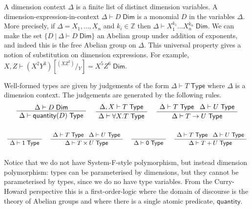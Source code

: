\documentclass[a4paper,UKenglish]{lipics}
\theoremstyle{plain}
\newcommand{\msf}[1]{\mathsf{#1}} %
\newcommand{\unitTy}{\msf{1}}
\newcommand{\emptyTy}{\msf{0}}
\newcommand{\qnt}{\msf{quantity}}
\newcommand{\Tj}[2]{#1 \vdash #2 \; \msf{ Type}}
\newcommand{\Dj}[2]{#1 \vdash #2 \; \msf{ Dim}}
\newcommand{\Dim}{D}
\newcommand{\Dvar}{X}
\begin{document}
\vspace{3mm} 
A dimension context $\Delta$ is a finite list of distinct
dimension variables.
A dimension-expression-in-context $\Dj\Delta \Dim$ is a monomial
$\Dim$ in the variables $\Delta$.
More precisely,
if $\Delta=\Dvar_1,\ldots, \Dvar_n$ and $k_i\in\mathbb Z$
then $\Dj \Delta{\Dvar_1^{k_1}\dots \Dvar_n^{k_n}}$.
We can make the set $\{\Dim~|~\Dj \Delta \Dim\}$ an Abelian group under addition of
exponents, and indeed this is the free Abelian group on $\Delta$.
This universal property gives a notion of substitution on dimension expressions.
For example,
$\Dj{X,Z}{(X^2Y^3)[^{(XZ^2)}\!/\!_Y]=X^5Z^6}$.

\vspace{3mm}  Well-formed types are given by judgements of the form $\Tj\Delta  T$ where
$\Delta$ is a dimension context. The judgements are generated by the following rules.
\[\begin{array}{c}
\AxiomC{$\Dj\Delta \Dim$}
		\UnaryInfC{$\Tj\Delta {\qnt(\Dim)}$}
		\DisplayProof

\hspace{5mm}
\AxiomC{$\Tj {\Delta, \Dvar}  T$}
	\UnaryInfC{$\Tj \Delta{ \forall \Dvar.T} $}
	\DisplayProof
\hspace{5mm}
\AxiomC{$\Delta \vdash T \; \msf{ Type} \; \; \; \Delta \vdash U \; \msf{ Type}$}
	\UnaryInfC{$\Delta \vdash T \rightarrow U  \; \msf{ Type}$}
	\DisplayProof
\\ \\
\end{array}\]
\[ \begin{array}{c}
\AxiomC{  $\phantom{\vdash T \; \msf{ Type}}$ }
		\UnaryInfC{$\Delta \vdash \unitTy \; \msf{ Type}$}
	\DisplayProof
\hspace{5mm}
\AxiomC{$\Delta \vdash T \; \msf{ Type} \; \; \; \Delta \vdash U \; \msf{ Type}$}
	\UnaryInfC{$\Delta \vdash T\times U \; \msf{ Type}$}
	\DisplayProof
\hspace{5mm}
\AxiomC{  $\phantom{ \vdash T \; \msf{ Type}}$ }
		\UnaryInfC{$\Delta \vdash \emptyTy \; \msf{ Type}$}
	\DisplayProof
\hspace{5mm}
\AxiomC{$\Delta \vdash T \; \msf{ Type} \; \; \; \Delta \vdash U \; \msf{ Type}$}
	\UnaryInfC{$\Delta \vdash T + U \; \msf{ Type}$}
	\DisplayProof
\\ \\
\end{array}\]
Notice that we do not have System-F-style polymorphism, but instead dimension polymorphism: types can be parameterised by dimensions, but they cannot be parameterised by types, since we do no have type variables. From the Curry-Howard perspective this is a first-order-logic where the domain of discourse is the theory of Abelian groups and where there is a single atomic predicate, $\qnt$.
\end{document}
